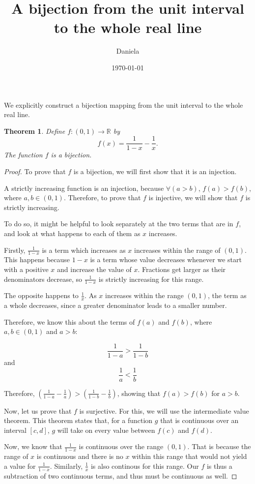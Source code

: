 \documentclass[11pt,reqno,oneside,a4paper]{article}
\title{A bijection from the unit interval to the whole real line}
\author{Daniela}
\date{\today}
\newtheorem{theorem}{Theorem}
\begin{document}
\maketitle


We explicitly construct a bijection mapping from the unit interval to the whole real line.

\begin{theorem} \label{thm:BijectionRInterval}
	Define $f : (0,1) \to \mathbb{R}$ by
	$$
		f(x) =\frac{1}{1-x} - \frac{1}{x}.
	$$
	The function $f$ is a bijection.
\end{theorem}

\begin{proof}

To prove that $f$ is a bijection, we will first show that it is an injection.

A strictly increasing function is an injection, because $\forall (a > b)$,  $f(a) > f(b)$, where $a, b \in (0,1)$. Therefore, to prove that $f$ is injective, we will show that $f$ is strictly increasing.

To do so, it might be helpful to look separately at the two terms that are in $f$, and look at what happens to each of them as $x$ increases.

Firstly, $\frac{1}{1-x}$ is a term which increases as $x$ increases within the range of $(0,1)$. This happens because $1 - x$ is a term whose value decreases whenever we start with a positive $x$ and increase the value of $x$. Fractions get larger as their denominators decrease, so $\frac{1}{1-x}$ is strictly increasing for this range.

The opposite happens to $\frac{1}{x}$. As $x$ increases within the range $(0,1)$, the term as a whole decreases, since a greater denominator leads to a smaller number.

Therefore, we know this about the terms of $f(a)$ and $f(b)$, where  $a, b \in (0,1)$ and $a > b$:

$$\frac{1}{1-a} > \frac{1}{1-b} $$ 
and 
$$\frac{1}{a} < \frac{1}{b} $$

Therefore, $\left(\frac{1}{1-a} - \frac{1}{a}\right) >  \left(\frac{1}{1-b} - \frac{1}{b}\right)$, showing that $f(a) > f(b)$ for $a>b$.

Now, let us prove that $f$ is surjective. For this, we will use the intermediate value theorem. This theorem states that, for a function $g$ that is continuous over an interval $[c,d]$, $g$ will take on every value between $f(c)$ and $f(d)$. 

Now, we know that $\frac{1}{1-x}$ is continuous over the range $(0,1)$. That is because the range of $x$ is continuous and there is no $x$ within this range that would not yield a value for $\frac{1}{1-x}$. Similarly, $\frac{1}{x}$ is also continous for this range. Our $f$ is thus a subtraction of two continuous terms, and thus must be continuous as well.


\end{proof}
\end{document}
